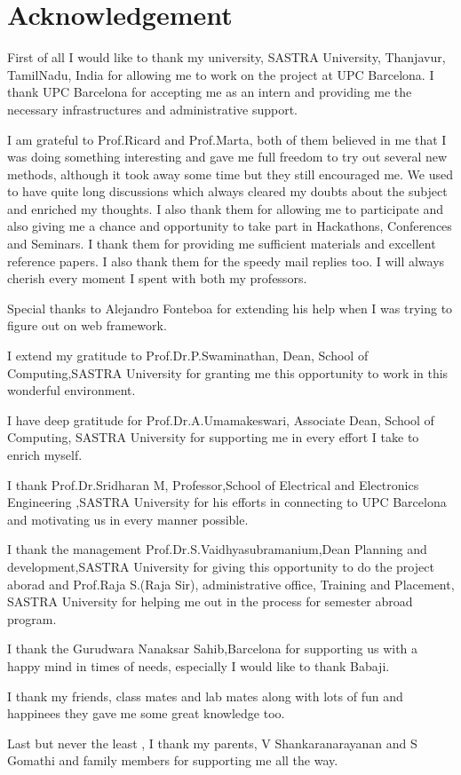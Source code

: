 \newpage
\clearpage
\newpage
\section*{Acknowledgement}
First of all I would like to thank my university, SASTRA University, Thanjavur, TamilNadu, India for allowing me to work on the project at UPC Barcelona. I thank UPC Barcelona for accepting me as an intern and providing me the necessary infrastructures and administrative support. 
\par I am grateful to Prof.Ricard and Prof.Marta, both of them believed in me that I was doing something interesting and gave me full freedom to try out several new methods, although it took away some time but they still encouraged me. We used to have quite long discussions which always cleared my doubts about the subject and enriched my thoughts. I also thank them for allowing me to participate and also giving me a chance and opportunity to take part in Hackathons, Conferences and Seminars. I thank them for providing me sufficient materials and excellent reference papers. I also thank them for the speedy mail replies too. I will always cherish every moment I spent with both my professors. 
\par Special thanks to Alejandro Fonteboa for extending his help when I was trying to figure out on web framework. 
\par  I extend my gratitude to Prof.Dr.P.Swaminathan, Dean, School of Computing,SASTRA University for granting me this opportunity to work in this wonderful environment.
\par 
I have deep gratitude for Prof.Dr.A.Umamakeswari, Associate Dean, School of Computing, SASTRA University for supporting me in every effort I take to enrich myself.
\par 
I thank Prof.Dr.Sridharan M, Professor,School of Electrical and Electronics Engineering ,SASTRA University for his efforts in connecting to UPC Barcelona and motivating us in every manner possible.
\par 
I thank the management Prof.Dr.S.Vaidhyasubramanium,Dean Planning and development,SASTRA University for giving this opportunity to do the project aborad and Prof.Raja S.(Raja Sir), administrative office, Training and Placement, SASTRA University for helping me out in the process for semester abroad program.
\par 
I thank the Gurudwara Nanaksar Sahib,Barcelona for supporting us with a happy mind in times of needs, especially I would like to thank Babaji.
\par I thank my friends, class mates and lab mates along with lots of fun and happinees they gave me some great knowledge too.
\par 
Last but never the least , I thank my parents, V Shankaranarayanan and S Gomathi and family members for supporting me all the way.

